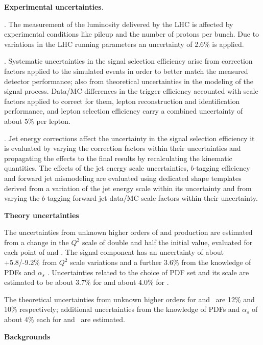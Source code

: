 \textbf{Experimental uncertainties}.

\bit
\item {}. The measurement of the luminosity delivered by the LHC is affected by experimental conditions like pileup and the number of protons per bunch. Due to variations in the LHC running parameters an uncertainty of 2.6\% is applied.

\item {}. Systematic uncertainties in the signal selection efficiency arise from correction factors applied to the simulated events in order to better match the measured detector performance; also from theoretical uncertainties in the modeling of the signal process. Data/MC differences in the trigger efficiency accounted with scale factors applied to correct for them, lepton reconstruction and identification performance, and lepton selection efficiency carry a combined uncertainty of about 5\% per lepton.

\item {}. Jet energy corrections affect the uncertainty in the signal selection efficiency it is evaluated by varying the correction factors within their uncertainties and propagating the effects to the final results by recalculating the kinematic quantities. The effects of the jet energy scale uncertainties, $b$-tagging efficiency and forward jet mismodeling are evaluated using dedicated shape templates derived from a variation of the jet energy scale within its uncertainty and from varying the $b$-tagging forward jet data/MC scale factors within their uncertainty.
\eit

\textbf{Theory uncertainties}

The uncertainties from unknown higher orders of \tHq and \tHW production are estimated from a change in the $Q^2$ scale of double and half the initial value, evaluated for each point of \Ct and \CV. The \ttH signal component has an uncertainty of about +5.8/-9.2\% from $Q^2$ scale variations and a further 3.6\% from the knowledge of PDFs and $\alpha_s $ \cite{yellow}. Uncertainties related to the choice of PDF set and its scale are estimated to be about 3.7\% for \tHq and about 4.0\% for \tHW.

The theoretical uncertainties from unknown higher orders for \ttW and \ttZ\ are 12\% and 10\% respectively; additional uncertainties from the knowledge of PDFs and $\alpha_s $ of about 4\% each for \ttW and \ttZ\ are estimated.

\textbf{Backgrounds}

